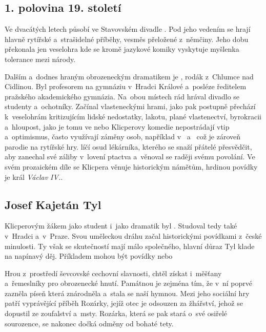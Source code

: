\subsection*{1. polovina 19. století
}
Ve dvacátých letech působí ve Stavovském divadle . Pod jeho vedením se hrají hlavně rytířské a~strašidelné
příběhy, vesměs přeložené z~němčiny. Jeho dobu překonala jen veselohra
 kde se kromě jazykové komiky vyskytuje myšlenka
tolerance mezi národy. 

Dalším a~dodnes hraným obrozeneckým dramatikem je , rodák z~Chlumce nad Cidlinou. Byl profesorem na gymnáziu
v~Hradci Králové a~posléze ředitelem pražského akademického gymnázia.
Na~obou místech rád hrával divadlo se studenty a~ochotníky. Začínal
vlasteneckými hrami, jako  pak postupně přechází
k~veselohrám kritizujícím lidské nedostatky, lakotu, plané vlastenectví,
byrokracii a~hloupost, jako je tomu ve  nebo
 Klicperovy komedie nepostrádají vtip a~optimismus,
často využívají záměny osob, například v~
a~ což je zároveň parodie na rytířské hry.
 líčí osud lékárníka, kterého se snaží přátelé přesvědčit,
aby zanechal své záliby v~lovení ptactva a~věnoval se raději svému
povolání. Ve svém prozaickém díle se Klicpera věnuje historickým
námětům, hrdinou povídky  je král \emph{Václav IV.}.

\subsection*{Josef Kajetán Tyl}
Klicperovým žákem jako student i~jako dramatik byl . Studoval tedy také v~Hradci a~v~Praze. Svou uměleckou dráhu začal
historickými povídkami z~české minulosti. Ty však se skutečností mají
málo společného, hlavní důraz Tyl klade na napínavý děj. Příkladem mohou
být povídky  nebo 

Hrou z~prostředí ševcovské cechovní slavnosti,  chtěl získat i~měšťany a~řemeslníky pro
obrozenecké hnutí. Památnou je zejména tím, že v~ní poprvé zazněla píseň
  která
znárodněla a~stala se naší hymnou. Mezi jeho sociální hry patří
 vyprávějící příběh Rozárky, jejíž otec je odsouzen
za žhářství, jehož se dopustil ze zoufalství a~msty. Rozárka, která se
pak stará o~své osiřelé sourozence, se nakonec dočká odměny od bohaté
tety.

